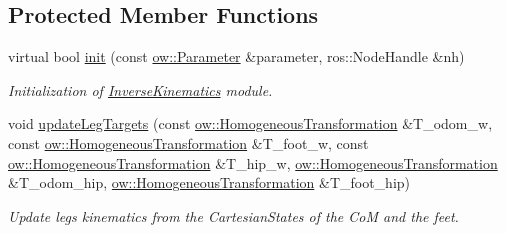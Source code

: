\subsection*{Protected Member Functions}
\begin{DoxyCompactItemize}
\item 
virtual bool \hyperlink{classow__ik_1_1InverseKinematics_a5469dd0c342af9bee2b5591d543540ec}{init} (const \hyperlink{classow_1_1Parameter}{ow\+::\+Parameter} \&parameter, ros\+::\+Node\+Handle \&nh)\hypertarget{classow__ik_1_1InverseKinematics_a5469dd0c342af9bee2b5591d543540ec}{}\label{classow__ik_1_1InverseKinematics_a5469dd0c342af9bee2b5591d543540ec}

\begin{DoxyCompactList}\small\item\em Initialization of \hyperlink{classow__ik_1_1InverseKinematics}{Inverse\+Kinematics} module. \end{DoxyCompactList}\item 
void \hyperlink{classow__ik_1_1InverseKinematics_a1deda077f2c28bc6ed71ae3fff79e785}{update\+Leg\+Targets} (const \hyperlink{classow__core_1_1HomogeneousTransformation}{ow\+::\+Homogeneous\+Transformation} \&T\+\_\+odom\+\_\+w, const \hyperlink{classow__core_1_1HomogeneousTransformation}{ow\+::\+Homogeneous\+Transformation} \&T\+\_\+foot\+\_\+w, const \hyperlink{classow__core_1_1HomogeneousTransformation}{ow\+::\+Homogeneous\+Transformation} \&T\+\_\+hip\+\_\+w, \hyperlink{classow__core_1_1HomogeneousTransformation}{ow\+::\+Homogeneous\+Transformation} \&T\+\_\+odom\+\_\+hip, \hyperlink{classow__core_1_1HomogeneousTransformation}{ow\+::\+Homogeneous\+Transformation} \&T\+\_\+foot\+\_\+hip)
\begin{DoxyCompactList}\small\item\em Update legs kinematics from the Cartesian\+States of the CoM and the feet. \end{DoxyCompactList}\end{DoxyCompactItemize}
